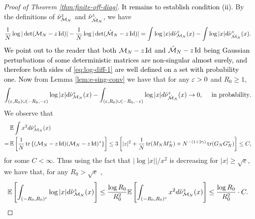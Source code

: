 \documentclass{amsart}
\numberwithin{equation}{section}
\def\corEE{\textcolor{amethyst}}
\def\corEE{}
\def\corABrev{\textcolor{black}}
\begin{document}
\begin{proof}[Proof of Theorem \ref{thm:finite-off-diag}]

\corABrev{It remains to establish condition (ii).} By the definitions of
$\tilde\nu_{\mathcal{M}_N}^z$ and $\tilde\nu_{\hat{\mathcal{M}}_N}^z$, we have
\begin{equation}\label{eq:log-diff-1}
\frac{1}{N} \log |\det(\mathcal{M}_N - z \operatorname{Id})| - \frac{1}{N} \log |\det(\hat{\mathcal{M}}_N - z \operatorname{Id})|= \int \log |x| d\tilde\nu_{\mathcal{M}_N}^z(x) - \int \log |x| d\tilde\nu_{\hat{\mathcal{M}}_N}^z(x).
\end{equation}
\corABrev{We point out to the reader that both $\mathcal{M}_N - z \operatorname{Id}$ and $\hat {\mathcal{M}}_N - z \operatorname{Id}$ being Gaussian perturbations of some deterministic matrices are non-singular almost surely, and therefore both sides of \eqref{eq:log-diff-1} are well defined on a set with probability one. Now}
from Lemma \ref{lem:e-sing-conv} we have that for any $\varepsilon >0$ and $R_0 \ge 1$,
\begin{equation}\label{eq:log-diff-2}
\int_{(\varepsilon, R_0) \cup (-R_0, - \varepsilon)} \log |x| d\tilde\nu_{\mathcal{M}_N}^z (x) - \int_{(\varepsilon, R_0) \cup (-R_0, - \varepsilon)} \log |x| d\tilde\nu_{\hat{\mathcal{M}}_N}^z (x) \to 0, \quad \text{ in probability}.
\end{equation}
We observe that
\begin{align*}
& \, \E \int x^2 d\tilde\nu_{\model_N}^z(x)\\
= & \, \E\left[\frac{1}{N}\tr \left\{ (\model_N - z \Id) (\model_N - z \Id)^*\right\}\right] \le \corEE{3} \left[ |z|^2 + \frac{1}{N}\tr (M_N M_N^*) + N^{-(1+2\gamma)} \tr(G_NG_N^*)\right] \le C,
\end{align*}
for some $C <\infty$. Thus using the fact that $|\log |x|| /x^2$ is decreasing for $|x| \ge  \sqrt{e}$, we have that, for any $R_0 >\sqrt{e}$ ,
\[
\mathbb E \left[\int_{(-R_0,R_0)^c} \log |x| d \tilde\nu_{\mathcal{M}_N}^z(x)\right] \le \frac{\log R_0}{R_0^2} \mathbb E \left[\int_{(-R_0,R_0)^c} x^2 d \tilde\nu_{\mathcal{M}_N}^z(x)\right] \le \frac{\log R_0}{R_0^2}  \cdot C.
\]
\end{proof}
\end{document}
